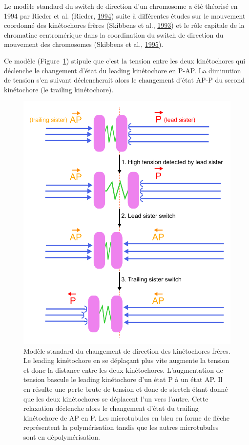 \documentclass[12pt,a4paper,twoside,openright]{book}
\begin{document}
Le modèle standard du switch de direction d'un chromosome a été théorisé
en 1994 par Rieder et al. (Rieder, \hyperref[ref-Rieder1994]{1994})
suite à différentes études sur le mouvement coordonné des kinétochores
frères (Skibbens et al., \hyperref[ref-Skibbens1993]{1993}) et le rôle
capitale de la chromatine centromérique dans la coordination du switch
de direction du mouvement des chromosomes (Skibbens et al.,
\hyperref[ref-Skibbens1995]{1995}).

Ce modèle (Figure~\ref{fig:run-switch}) stipule que c'est la tension
entre les deux kinétochores qui déclenche le changement d'état du
leading kinétochore en P-AP. La diminution de tension s'en suivant
déclencherait alors le changement d'état AP-P du second kinétochore (le
trailing kinétochore).

\begin{figure}[htbp]
\centering
\includegraphics{figures/intro/run_switch.png}
\caption[Modèle standard du changement de direction des kinétochores frères.]{\label{fig:run-switch}Modèle
standard du changement de direction des kinétochores frères. Le leading
kinétochore en se déplaçant plus vite augmente la tension et donc la
distance entre les deux kinétochores. L'augmentation de tension bascule
le leading kinétochore d'un état P à un état AP. Il en résulte une perte
brute de tension et donc de stretch étant donné que les deux
kinétochores se déplacent l'un vers l'autre. Cette relaxation déclenche
alors le changement d'état du trailing kinétochore de AP en P. Les
microtubules en bleu en forme de flèche représentent la polymérisation
tandis que les autres microtubules sont en dépolymérisation.}
\end{figure}
\end{document}
